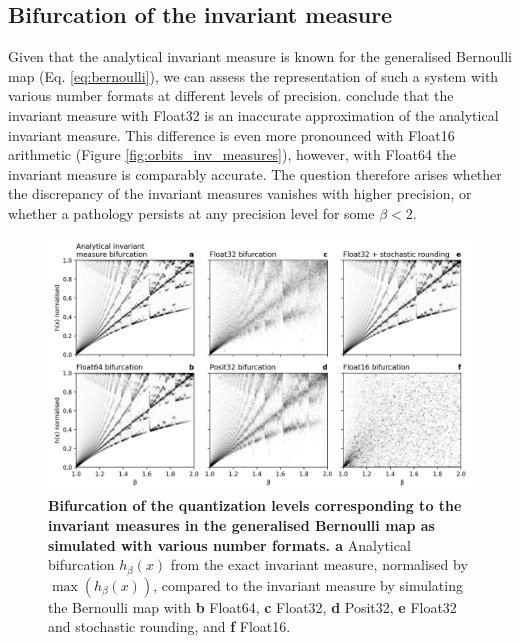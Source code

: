 \subsection{Bifurcation of the invariant measure}
\label{sec:bifurcation}

Given that the analytical invariant measure is known for the generalised Bernoulli map (Eq. \ref{eq:bernoulli}), we can assess
the representation of such a system with various number formats at different levels of precision. \cite{Boghosian2019} conclude
that the invariant measure with Float32 is an inaccurate approximation of the analytical invariant measure. This difference is even
more pronounced with Float16 arithmetic (Figure \ref{fig:orbits_inv_measures}), however, with Float64 the invariant measure is
comparably accurate. The question therefore arises whether the discrepancy of the invariant measures vanishes with higher precision,
or whether a pathology persists at any precision level for some $\beta < 2$.

\begin{figure}[tbhp]
	\includegraphics[width=1\textwidth]{Figures/orbits/bifurcation.png}
	\caption{\textbf{Bifurcation of the quantization levels corresponding to the invariant measures in
	the generalised Bernoulli map as simulated with various number formats. a}
	Analytical bifurcation $h_\beta(x)$ from the exact invariant measure, normalised by $\max(h_\beta(x))$,
	compared to the invariant measure by simulating the Bernoulli map with \textbf{b} Float64, \textbf{c} Float32,
	\textbf{d} Posit32, \textbf{e} Float32 and stochastic rounding, and \textbf{f} Float16.}
	\label{fig:orbits_bifurcation}
\end{figure}


